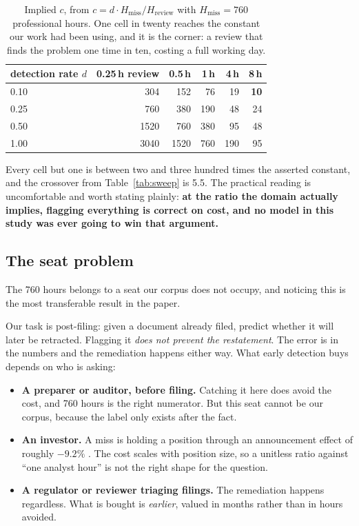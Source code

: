 \documentclass[11pt]{article}
\begin{document}
\begin{table}[t]
\centering\small
\begin{tabular}{lrrrrr}
\toprule
detection rate $d$ & 0.25\,h review & 0.5\,h & 1\,h & 4\,h & 8\,h \\
\midrule
0.10 & 304  & 152  & 76  & 19 & \textbf{10} \\
0.25 & 760  & 380  & 190 & 48 & 24 \\
0.50 & 1520 & 760  & 380 & 95 & 48 \\
1.00 & 3040 & 1520 & 760 & 190 & 95 \\
\bottomrule
\end{tabular}
\caption{Implied $c$, from $c = d \cdot H_\text{miss} / H_\text{review}$ with
$H_\text{miss}=760$ professional hours. One cell in twenty reaches the constant our work had
been using, and it is the corner: a review that finds the problem one time in ten, costing a
full working day.}
\label{tab:hours}
\end{table}

Every cell but one is between two and three hundred times the asserted constant, and the
crossover from Table~\ref{tab:sweep} is 5.5. The practical reading is uncomfortable and worth
stating plainly: \textbf{at the ratio the domain actually implies, flagging everything is
correct on cost, and no model in this study was ever going to win that argument.}

\subsection{The seat problem}
\label{sec:seat}

The 760 hours belongs to a seat our corpus does not occupy, and noticing this is the most
transferable result in the paper.

Our task is post-filing: given a document already filed, predict whether it will later be
retracted. Flagging it \emph{does not prevent the restatement}. The error is in the numbers and
the remediation happens either way. What early detection buys depends on who is asking:

\begin{itemize}
\item \textbf{A preparer or auditor, before filing.} Catching it here does avoid the cost, and
760 hours is the right numerator. But this seat cannot be our corpus, because the label only
exists after the fact.
\item \textbf{An investor.} A miss is holding a position through an announcement effect of
roughly $-9.2\%$ \citep{gao2002}. The cost scales with position size, so a unitless ratio
against ``one analyst hour'' is not the right shape for the question.
\item \textbf{A regulator or reviewer triaging filings.} The remediation happens regardless.
What is bought is \emph{earlier}, valued in months rather than in hours avoided.
\end{itemize}
\end{document}
